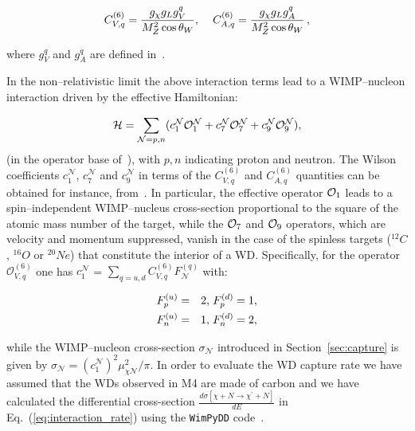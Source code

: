 \documentclass[11pt]{article}
\begin{document}
\begin{equation}
    C^{(6)}_{V,q}=\frac{g_{\chi} g_L g^q_V}{M^2_{Z} \cos\theta_W}, \hspace{4mm}C^{(6)}_{A,q}=\frac{g_{\chi} g_L g^q_A}{M^2_{Z} \cos\theta_W}\,, 
\end{equation}

\noindent where $g^q_V$ and $g^q_A$ are defined in~\cite{SM_couplings_Romao2012}. 

In the non--relativistic limit the above interaction terms lead to a WIMP--nucleon interaction driven by the effective Hamiltonian:

\begin{equation}
    {\cal H}=\sum_{\mathcal{N}=p,n} ( c_1^{\mathcal{N}} {\cal O}_1^{\mathcal{N}} + c_7^{\mathcal{N}} {\cal O}_7^{\mathcal{N}} + c_9^{\mathcal{N}} {\cal O}_9^{\mathcal{N}}), 
\end{equation}
\noindent (in the operator base of~\cite{haxton1}), with $p,n$ indicating proton and neutron. The Wilson coefficients $c_1^{\mathcal{N}}$, $c_7^{\mathcal{N}}$ and $c_9^{\mathcal{N}}$ in terms of the $C^{(6)}_{V,q}$ and $C^{(6)}_{A,q}$ quantities can be obtained for instance, from~\cite{form_factor_Bishara2017}. In particular,  the effective operator ${\cal O}_1$ leads to a spin--independent WIMP--nucleus cross-section  proportional to the square of the atomic mass number of the target, while the ${\cal O}_7$ and ${\cal O}_9$ operators, which are velocity and momentum suppressed, vanish in the case of the spinless targets ($^{12}C$, $^{16}O$ or $^{20}Ne$) that constitute the interior of a WD. Specifically, for the operator $\mathcal{O}^{(6)}_{V,q}$ one has $c_1^{\mathcal{N}}$ = $\sum_{q=u,d} C^{(6)}_{V,q} F_{\mathcal{N}}^{(q)}$ with:

\begin{eqnarray}
F^{(u)}_p&=&2,\hspace{0.5mm}F^{(d)}_p=1,\\
F^{(u)}_n&=&1,\hspace{0.5mm}F^{(d)}_n=2,
\end{eqnarray}
    
\noindent while the WIMP--nucleon cross-section $\sigma_{\mathcal{N}}$ introduced in Section~\ref{sec:capture} is given by 
$\sigma_{\mathcal{N}}=(c_1^{\mathcal{N}})^2\mu_{\chi \mathcal{N}}^2/\pi$. 
In order to evaluate the WD capture rate we have assumed that the WDs observed in M4 are made of carbon and we have calculated the differential cross-section  $\frac{d\sigma[\chi+N \rightarrow \chi^{\prime}+N]}{dE}$ in Eq.~(\ref{eq:interaction_rate}) using the \verb|WimPyDD| code~\cite{wimpydd,wimpydd_conf}. 
\end{document}
